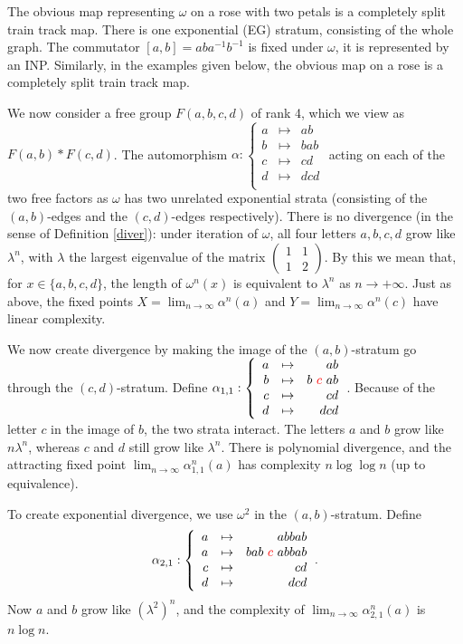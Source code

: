\documentclass[11pt]{amsart}
\theoremstyle{remark}
\newcommand{\m} {^{-1}}
\newcommand\mii[4]{\left(\begin{array}{rr} #1&#2\\ #3&#4 \end{array}\right)}
\begin{document}
The obvious map representing $\omega$ on a rose with two petals is a completely split train track map. There is one exponential  (EG) stratum, consisting of the whole graph. 
The commutator $[a,b]=aba\m b\m$ is fixed under $\omega$, it is represented by an INP.
Similarly, in the examples given below, the obvious map on a rose is a completely split train track map.

We now consider a free group $F(a,b,c,d)$ of rank 4, which we view as $F(a,b)*F(c,d)$.  The automorphism $\alpha:
{\left\{\begin{array}{rrr} a&\mapsto &{ab}\\ 
b&\mapsto &{bab}\\ 
c&\mapsto &{cd}\\ 
d&\mapsto& {dcd}\\ 
    \end{array}\right.}$ acting on each of the two free factors  as $\omega$ has two unrelated exponential strata (consisting of the $(a,b)$-edges and the $(c,d)$-edges respectively). 
    There is no divergence (in the sense of  Definition \ref{diver}): 
    under iteration of $\omega$, all four letters $a,b,c,d$ grow like $\lambda^n$, with $\lambda$ the largest eigenvalue of the matrix $\mii1112$.  By this we mean that, for $x\in\{a,b,c,d\}$, the length of $\omega^n(x)$ is equivalent to $\lambda^n$ as $n\to+\infty$. Just as above, the fixed points $X=\lim_{n\to\infty}\alpha^n(a)$ and $Y=\lim_{n\to\infty}\alpha^n(c)$ have linear complexity.
    
    
 

We now create divergence by making the image of the $(a,b)$-stratum  go through the $(c,d)$-stratum. Define 
$\alpha_{1,1} :{\left\{\begin{array}{rrr} 
a&\mapsto &{ab}\\ 
b&\mapsto &{b}{\color{red}\ c}\ ab\\ 
c&\mapsto &{cd}\\ 
d&\mapsto& {dcd}\\ 
    \end{array}\right.}  $. Because of the letter $c$ in the image of 
     $b$,
     the two strata interact. The letters $a$ and $b$ grow like $n\lambda^n$, whereas $c$ and $d$ still grow like $\lambda^n$. There is polynomial divergence, and the attracting fixed point $\lim_{n\to\infty}\alpha_{1,1}^n(a)$ has complexity $n\log\log n$  (up to equivalence).
    
    To create exponential divergence,  we use $\omega^2$ in the $(a,b)$-stratum. Define  
$$\alpha_{2,1}:{\left\{\begin{array}{rrr} 
{a}&\mapsto &{abbab}\\ 
{a}&\mapsto &{bab\   {\color{red} c}}\ abbab\\ 
c&\mapsto &{cd}\\ 
d&\mapsto& {dcd}\\ 
    \end{array}\right.}   .$$ Now $a$ and $b$ grow like $(\lambda^2)^n$, and  the complexity of $\lim_{n\to\infty}\alpha_{2,1}^n(a)$ is  $n\log  n$.
\end{document}
